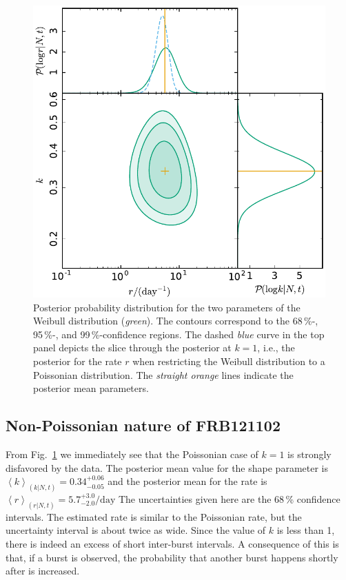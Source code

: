 \documentclass[fleqn,usenatbib]{mnras}
\newcommand{\new}[1]{#1}
\begin{document}
\begin{figure}
	\includegraphics[width=1.0\columnwidth]{2dpost.pdf}
	\caption{\label{fig:result}Posterior probability distribution for the two parameters of the Weibull distribution (\emph{green}). The contours correspond to the 68\,\%-, 95\,\%-, and 99\,\%-confidence regions. The dashed \emph{blue} curve in the top panel depicts the slice through the posterior at $k=1$, i.e., the posterior for the rate $r$ when restricting the Weibull distribution to a Poissonian distribution. The \emph{straight orange} lines indicate the posterior mean parameters.}
\end{figure}


\subsection{Non-Poissonian nature of FRB121102}
\label{sec:non-poissonian}

From Fig.~\ref{fig:result} we immediately see that the Poissonian case of $k=1$ is strongly disfavored by the data. The posterior mean value for the shape parameter is \new{$\left<k\right>_{(k|N,t)} = 0.34^{+0.06}_{-0.05}$} and the posterior mean for the rate is \new{$\left<r\right>_{(r|N,t)} = 5.7^{+3.0}_{-2.0}/\mathrm{day}$ The uncertainties given here are the 68\,\% confidence intervals. The estimated rate is similar to the Poissonian rate, but the uncertainty interval is about twice as wide.} Since the value of $k$ is less than 1, there is indeed an excess of short inter-burst intervals. A consequence of this is that, if a burst is observed, the probability that another burst happens shortly after is increased.
\end{document}
